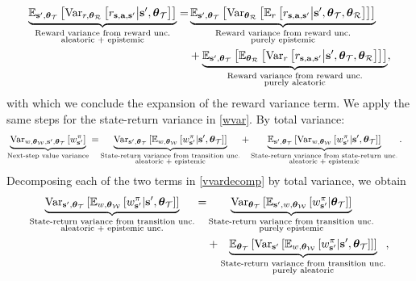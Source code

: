 \documentclass{article}
\begin{document}
\begin{align}\label{appeq:rerwvarrew}
\underbrace{\E_{\ns, \thetamct}\sqb{ \Var_{r, \thetamcr} \sqb{\rsanb \big| \ns, \thetamct}}}_{\substack{\text{Reward variance from reward unc.} \\ \text{aleatoric + epistemic}}} = &\underbrace{\E_{\ns, \thetamct}\sqb{ \Var_{\thetamcr} \sqb{ \E_r \sqb{\rsanb \big| \ns, \thetamct, \thetamcr}}}}_{\substack{\text{Reward variance from reward unc.} \\ \text{purely epistemic}}} \\ 
&+ \underbrace{\E_{\ns, \thetamct}\sqb{ \E_{\thetamcr} \sqb{ \Var_r \sqb{\rsanb \big| \ns, \thetamct, \thetamcr}}}}_{\substack{\text{Reward variance from reward unc.} \\ \text{purely aleatoric}}},\nonumber
\end{align}
with which we conclude the expansion of the reward variance term. We apply the same steps for the state-return variance in \cref{wvar}. By total variance:
\begin{align} \label{vvardecomp}
\underbrace{\Var_{w, \thetamcw, \ns, \thetamct}\sqb{\wnb}}_{\text{Next-step value variance}} =& \underbrace{\Var_{\ns, \thetamct}\sqb{\E_{w, \thetamcw} \sqb{\wnb | \ns, \thetamct}}}_{\substack{\text{State-return variance from transition unc.} \\ \text{aleatoric + epistemic}}} + \underbrace{\E_{\ns, \thetamct}\sqb{\Var_{w, \thetamcw} \sqb{\wnb | \ns, \thetamct}}}_{\substack{\text{State-return variance from state-return unc.} \\ \text{aleatoric + epistemic}}}.
\end{align}
Decomposing each of the two terms in \cref{vvardecomp} by total variance, we obtain
\begin{align*}
\underbrace{\Var_{\ns, \thetamct}\sqb{\E_{w, \thetamcw} \sqb{\wnb | \ns, \thetamct}}}_{\substack{\text{State-return variance from transition unc.} \\ \text{aleatoric + epistemic unc.}}} =& \underbrace{\Var_{\thetamct} \sqb{\E_{\ns, w, \thetamcw} \sqb{\wnb | \thetamct}}}_{\substack{\text{State-return variance from transition unc.} \\ \text{purely epistemic}}} \\
& + \underbrace{\E_{\thetamct}\sqb{ \Var_{\ns} \sqb{\E_{w, \thetamcw} \sqb{\wnb | \ns, \thetamct}}}}_{\substack{\text{State-return variance from transition unc.} \\ \text{purely aleatoric}}},
\end{align*}
\end{document}
